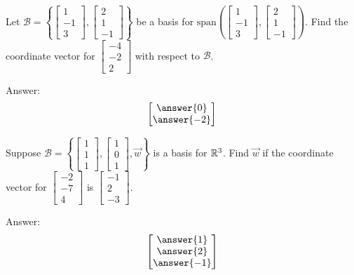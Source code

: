 \documentclass{ximera}
\begin{document}
\begin{problem}
Let $\mathcal{B}=\left\{\begin{bmatrix}1\\-1\\3\end{bmatrix},\begin{bmatrix}2\\1\\-1\end{bmatrix}\right\}$ be a basis for 
$\mbox{span}\left(\begin{bmatrix}1\\-1\\3\end{bmatrix},\begin{bmatrix}2\\1\\-1\end{bmatrix}\right)$.  Find the coordinate vector for $\begin{bmatrix}-4\\-2\\2\end{bmatrix}$ with respect to $\mathcal{B}$.

Answer:
$$\begin{bmatrix}\answer{0}\\\answer{-2}\end{bmatrix}$$
\end{problem}

\begin{problem}
Suppose $\mathcal{B}=\left\{\begin{bmatrix}1\\1\\1\end{bmatrix},\begin{bmatrix}1\\0\\1\end{bmatrix}, \vec{w}\right\}$ is a basis for $\mathbb{R}^3$.  Find $\vec{w}$ if the coordinate vector for $\begin{bmatrix}-2\\-7\\4\end{bmatrix}$ is $\begin{bmatrix}-1\\2\\-3\end{bmatrix}$.

Answer:
$$\begin{bmatrix}\answer{1}\\\answer{2}\\\answer{-1}\end{bmatrix}$$
\end{problem}
\end{document}
